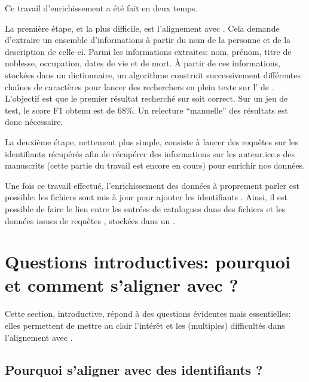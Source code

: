 Ce travail d'enrichissement a été fait en deux temps. 

La première étape, et la plus difficile, est l'alignement avec \wkd{}. Cela demande d'extraire un ensemble d'informations à partir du nom de la personne et de la description de celle-ci. Parmi les informations extraites: nom, prénom, titre de noblesse, occupation, dates de vie et de mort. À partir de ces informations, stockées dans un dictionnaire, un algorithme construit successivement différentes chaînes de caractères pour lancer des recherchers en plein texte sur l'\api{} de \wkd{}. L'objectif est que le premier résultat recherché sur \wkd{} soit correct. Sur un jeu de test, le \gls{score F1} obtenu est de 68\%. Un relecture \enquote{manuelle} des résultats est donc nécessaire.

La deuxième étape, nettement plus simple, consiste à lancer des requêtes \wkd{} sur les identifiants récupérés afin de récupérer des informations sur les auteur.ice.s des manuscrits (cette partie du travail est encore en cours) pour enrichir nos données.

Une fois ce travail effectué, l'enrichissement des données à proprement parler est possible: les fichiers \tei{} sont mis à jour pour ajouter les identifiants \wkd{}. Ainsi, il est possible de faire le lien entre les entrées de catalogues dans des fichiers \xml{} et les données issues de requêtes \sparql{}, stockées dans un \json.


\section{Questions introductives: pourquoi et comment s'aligner avec \wkd{} ?}
Cette section, introductive, répond à des questions évidentes mais essentielles: elles permettent de mettre au clair l'intérêt et les (multiples) difficultés dans l'alignement avec \wkd{}.

\subsection{Pourquoi s'aligner avec des identifiants \wkd{}?} 

